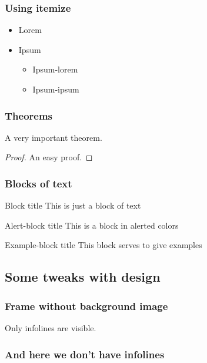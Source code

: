 \documentclass{beamer}
\begin{document}
\begin{frame}
\frametitle{Using itemize}
\begin{itemize}
\item Lorem 
\item Ipsum
\begin{itemize}
\item Ipsum-lorem
\item Ipsum-ipsum
\end{itemize}
\end{itemize}
\end{frame}

\begin{frame}
\frametitle{Theorems}
\begin{theorem}
A very important theorem.
\end{theorem}
\begin{proof}
An easy proof.
\end{proof}
\end{frame}


\begin{frame}
\frametitle{Blocks of text}
\begin{block}{Block title}
This is just a block of text
\end{block}

\begin{alertblock}{Alert-block title}
This is a block in alerted colors
\end{alertblock}

\begin{exampleblock}{Example-block title}
This block serves to give examples
\end{exampleblock}
\end{frame}

\subsection{Some tweaks with design}
{ %
\begin{frame}
\frametitle{Frame without background image}


Only infolines are visible.
\end{frame}
}

{%
\begin{frame}
\frametitle{And here we don't have infolines}
\end{frame}
}
\end{document}
